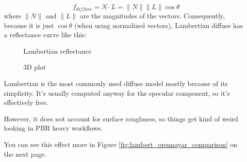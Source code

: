 \documentclass[12pt,letterpaper]{article}
\begin{document}
$$
f_{diffuse} = N \cdot L = \lVert N \rVert \lVert L \rVert \cos \theta
$$
where $\lVert N \rVert$ and $\lVert L \rVert$ are the magnitudes of the vectors. Consequently, 
because it is just $\cos \theta$ (when using normalized vectors), 
Lambertian diffuse has a reflectance curve like this:
\begin{figure}[htbp]
  \begin{minipage}[t]{0.5\linewidth}
    \centering
    \pgfplotsset{width=15em}
    \caption{Lambertian reflectance}
  \end{minipage}
  \hspace{-16pt}
  \begin{minipage}[t]{0.5\linewidth}
    \centering
    \pgfplotsset{width=20em}
    \caption{3D plot}
  \end{minipage}
\end{figure}

Lambertian is the most commonly used diffuse model mostly because of its simplicity. 
It's usually computed anyway for the specular component, so it's effectively free.

However, it does not account for surface roughness, so things get kind of weird looking in PBR heavy workflows.

You can see this effect more in Figure {\color{blue}\ref{fig:lambert_orennayar_comparison}} on the next page.

\newpage
\end{document}
